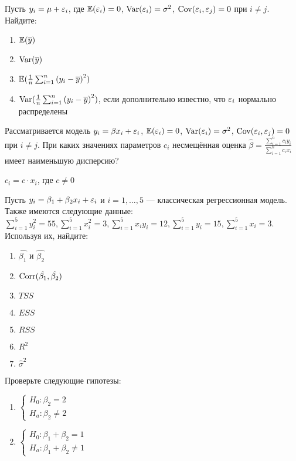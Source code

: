 \documentclass[pdftex,11pt,openany]{book}\usepackage[]{graphicx}\usepackage[]{color}
\begin{document}
\begin{solution}
\end{solution}


\begin{problem}
 Пусть $y_i=\mu+\varepsilon_i$, где $\mathbb{E}(\varepsilon_i)=0$, $\operatorname{Var}(\varepsilon_i)=\sigma^2$, $\operatorname{Cov}(\varepsilon_i,\varepsilon_j)=0$ при $i \ne j$. Найдите:
\begin{enumerate}
\item $\mathbb{E}(\overline{y})$
\item $\operatorname{Var}(\overline{y})$
\item $\mathbb{E}(\frac{1}{n}\sum_{i=1}^n {(y_i-\overline{y})}^2)$
\item $\operatorname{Var}(\frac{1}{n}\sum_{i=1}^n {(y_i-\overline{y})}^2)$, если дополнительно известно, что $\varepsilon_i$ нормально распределены
\end{enumerate}
\end{problem}
 
\begin{solution}
\end{solution}


\begin{problem}
 Рассматривается модель $y_i=\beta x_i+\varepsilon_i$, $\mathbb{E}(\varepsilon_i)=0$, $\operatorname{Var}(\varepsilon_i)=\sigma^2$, $\operatorname{Cov}(\varepsilon_i,\varepsilon_j)=0$ при $i \ne j$. 
При каких значениях параметров $c_i$ несмещённая оценка $\hat{\beta}=\frac{\sum_{i=1}^n {c_i y_i}}{\sum_{i=1}^n {c_i x_i}}$ имеет наименьшую дисперсию? 
\end{problem}
 
\begin{solution}
$c_i=c\cdot x_i$, где $c\neq 0$ 
\end{solution}


\begin{problem}
 Пусть $y_i = \beta_1 + \beta_2 x_i + \varepsilon_i$ и $i = 1, \dots, 5$ --- классическая регрессионная модель. Также имеются следующие данные: $\sum_{i=1}^5 y_i^2 = 55, \sum_{i=1}^5 x_i^2 = 3, \sum_{i=1}^5 x_iy_i = 12, \sum_{i=1}^5 y_i = 15, \sum_{i=1}^5 x_i = 3.$ Используя их, найдите:

\begin{enumerate}
\item $\hat{\beta_1}$ и $\hat{\beta_2}$
\item $\operatorname{Corr}(\hat{\beta_1}, \hat{\beta_2})$
\item $TSS$
\item $ESS$
\item $RSS$
\item $R^2$
\item $\hat{\sigma}^2$
\end{enumerate}

Проверьте следующие гипотезы:
\begin{enumerate}
\item $\begin{cases}  H_0: \beta_2 = 2  \\ H_a: \beta_2 \not= 2 \end{cases}$
\item $\begin{cases}  H_0: \beta_1 + \beta_2 = 1  \\ H_a: \beta_1 + \beta_2 \not= 1 \end{cases}$
\end{enumerate}
\end{problem}
\end{document}
